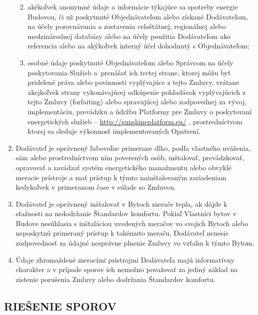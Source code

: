 \begin{multicols}{2}
\begin{enumerate}
  \begin{enumerate}
  \def\labelenumii{\arabic{enumii}.}
  \item
    akékoľvek anonymné údaje a informácie týkajúce sa spotreby energie
    Budovou, či už poskytnuté Objednávateľom alebo získané Dodávateľom,
    na účely porovnávania a zostavenia celoštátnej, regionálnej alebo
    medzinárodnej databázy alebo na účely použitia Dodávateľom ako
    referencia alebo na akýkoľvek interný účel dohodnutý s
    Objednávateľom;
  \item
    osobné údaje poskytnuté Objednávateľom alebo Správcom na účely
    poskytovania Služieb a~prenášať ich tretej strane, ktorej môžu byť
    pridelené práva alebo povinnosti vyplývajúce z tejto Zmluvy, vrátane
    akejkoľvek strany vykonávajúcej odkúpenie pohľadávok vyplývajúcich z
    tejto Zmluvy (forfaiting) alebo spravujúcej alebo zodpovednej za
    vývoj, implementáciu, prevádzku a údržbu Platformy pre Zmluvy o
    poskytovaní energetických služieb --
    \href{http://www.sharex.lv}{http://sunshineplatform.eu/} ,
    prostredníctvom ktorej sa sleduje výkonnosť implementovaných
    Opatrení.
  \end{enumerate}
\item
  Dodávateľ je oprávnený ľubovoľne primerane dlho, podľa vlastného
  uváženia, sám alebo prostredníctvom ním poverených osôb, inštalovať,
  prevádzkovať, opravovať a zavádzať systém energetického manažmentu
  alebo obvyklé meracie prístroje a mať prístup k týmto nainštalovaným
  zariadeniam kedykoľvek v primeranom čase v súlade so Zmluvou.
\item
  Dodávateľ je oprávnený inštalovať v Bytoch merače tepla, ak dôjde k
  sťažnosti na nedodržanie Štandardov komfortu. Pokiaľ Vlastníci bytov v
  Budove nesúhlasia s inštaláciou uvedených meračov vo svojich Bytoch
  alebo neposkytnú primeraný prístup k takémuto meraču, Dodávateľ
  nenesie zodpovednosť za údajné nesprávne plnenie Zmluvy vo vzťahu k
  týmto Bytom.
\item
  Údaje zhromaždené meracími prístrojmi Dodávateľa majú informatívny
  charakter a v prípade sporov ich nemožno považovať za jediný základ na
  zistenie porušenia Zmluvy alebo dodržania Štandardov komfortu.
\end{enumerate}

\subsection{RIEŠENIE SPOROV}


\end{multicols}
